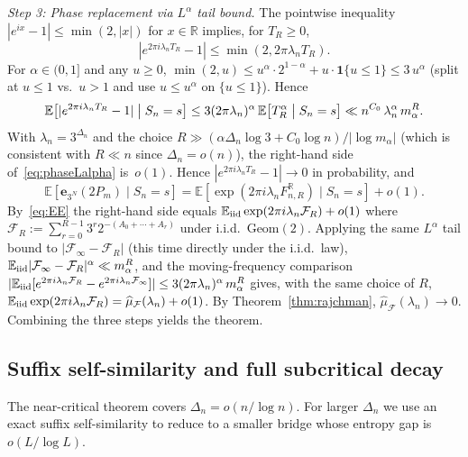 \documentclass[11pt,a4paper]{amsart}
\theoremstyle{plain}
\theoremstyle{definition}
\newcommand{\R}{\mathbb{R}}
\newcommand{\E}{\mathbb{E}}
\newcommand{\Geom}{\mathrm{Geom}}
\begin{document}
\medskip\noindent\emph{Step 3: Phase replacement via $L^\alpha$ tail bound.}
The pointwise inequality $|e^{ix}-1|\le\min(2,|x|)$ for $x\in\R$ implies,
for $T_R\ge 0$,
\begin{equation}\label{eq:phasediff}
|e^{2\pi i\lambda_n T_R}-1|\le\min(2,2\pi\lambda_n T_R).
\end{equation}
For $\alpha\in(0,1]$ and any $u\ge 0$, $\min(2,u)\le u^\alpha\cdot 2^{1-\alpha}+u\cdot\mathbf 1\{u\le 1\}\le 3\,u^\alpha$ (split at $u\le 1$ vs.\ $u>1$ and use $u\le u^\alpha$ on $\{u\le 1\}$).
Hence
\begin{equation}\label{eq:phaseLalpha}
\E\bigl[|e^{2\pi i\lambda_n T_R}-1|\bigm|S_n=s\bigr]
\le 3(2\pi\lambda_n)^\alpha\,\E\bigl[T_R^\alpha\bigm|S_n=s\bigr]
\ll n^{C_0}\,\lambda_n^\alpha\,m_\alpha^R.
\end{equation}
With $\lambda_n=3^{\Delta_n}$ and the choice $R\gg(\alpha\Delta_n\log 3+C_0\log n)/|\log m_\alpha|$
(which is consistent with $R\ll n$ since $\Delta_n=o(n)$), the right-hand
side of~\eqref{eq:phaseLalpha} is~$o(1)$.
Hence $|e^{2\pi i\lambda_n T_R}-1|\to 0$ in probability, and
\begin{equation}\label{eq:trunc-replace}
\E[\mathbf e_{3^N}(2P_m)\mid S_n=s]
=\E[\exp(2\pi i\lambda_n F_{n,R}^{\R})\mid S_n=s]+o(1).
\end{equation}
By~\eqref{eq:EE} the right-hand side equals
$\E_{\rm iid}\exp(2\pi i\lambda_n\mathcal F_R)+o(1)$
where $\mathcal F_R:=\sum_{r=0}^{R-1}3^r 2^{-(A_0+\cdots+A_r)}$ under
i.i.d.\ $\Geom(2)$.
Applying the same $L^\alpha$ tail bound to $|\mathcal F_\infty-\mathcal F_R|$
(this time directly under the i.i.d.\ law),
$\E_{\rm iid}|\mathcal F_\infty-\mathcal F_R|^\alpha\ll m_\alpha^R$, and the
moving-frequency comparison
$|\E_{\rm iid}[e^{2\pi i\lambda_n\mathcal F_R}-e^{2\pi i\lambda_n\mathcal F_\infty}]|
\le 3(2\pi\lambda_n)^\alpha\,m_\alpha^R$
gives, with the same choice of $R$,
$\E_{\rm iid}\exp(2\pi i\lambda_n\mathcal F_R)=\widehat\mu_{\mathcal F}(\lambda_n)+o(1)$.
By Theorem~\ref{thm:rajchman}, $\widehat\mu_{\mathcal F}(\lambda_n)\to 0$.
Combining the three steps yields the theorem.
\fi

\subsection{Suffix self-similarity and full subcritical decay}
The near-critical theorem covers $\Delta_n=o(n/\log n)$.
For larger $\Delta_n$ we use an exact suffix self-similarity to reduce to a
smaller bridge whose entropy gap is $o(L/\log L)$.
\end{document}
